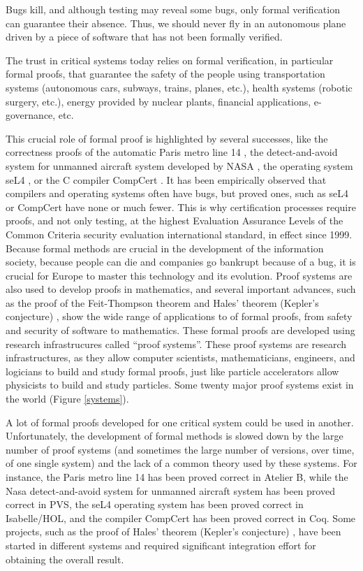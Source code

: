 \thispagestyle{empty}

Bugs kill, and although testing may reveal some bugs, only formal
verification can guarantee their absence.  Thus, we
should never fly in an autonomous plane driven by a piece of software
that has not been formally verified.

The trust in critical systems today relies on formal verification, in
particular formal proofs, that guarantee the safety of the people
using transportation systems (autonomous cars, subways, trains,
planes, etc.), health systems (robotic surgery, etc.), energy provided
by nuclear plants, financial applications, e-governance, etc. 

This crucial role of formal proof is highlighted by several successes,
like the correctness proofs of the automatic Paris metro line 14
\cite{metro14}, the detect-and-avoid system for unmanned aircraft
system developed by NASA \cite{Munoz16}, the operating system seL4
\cite{Klein09}, or the C compiler CompCert \cite{Leroy06}.  It has
been empirically observed that compilers and operating systems often
have bugs, but proved ones, such as seL4 or CompCert have none or much
fewer.  This is why certification processes require proofs, and not
only testing, at the highest Evaluation Assurance Levels of the Common
Criteria security evaluation international standard, in effect since
1999.  Because formal methods are crucial in the development of the
information society, because people can die and companies go bankrupt
because of a bug, it is crucial for Europe to master this technology
and its evolution.  Proof systems are also used to develop proofs in
mathematics, and several important advances, such as the proof of the
Feit-Thompson theorem \cite{Gonthier13} and Hales' theorem (Kepler's
conjecture) \cite{Hales17}, show the wide range of applications to of
formal proofs, from safety and security of software to mathematics.
These formal proofs are developed using research infrastrucures called
``proof systems''.
These proof systems are research infrastructures, as they allow
computer scientists, mathematicians, engineers, and logicians to build
and study formal proofs, just like particle accelerators allow
physicists to build and study particles.
Some twenty major proof systems exist in the world
(Figure \ref{systems}).

A lot of formal proofs developed for one critical system could be used
in another.  Unfortunately, the development of formal methods is
slowed down by the large number of proof systems (and sometimes the
large number of versions, over time, of one single system) and the
lack of a common theory used by these systems.  For instance, the
Paris metro line 14 has been proved correct in Atelier B, while the
Nasa detect-and-avoid system for unmanned aircraft system has been
proved correct in PVS, the seL4 operating system has been proved
correct in Isabelle/HOL, and the compiler CompCert has been proved
correct in Coq.  Some projects, such as the proof of Hales' theorem
(Kepler's conjecture) \cite{Hales17}, have been started in different
systems and required significant integration effort for obtaining the
overall result.

